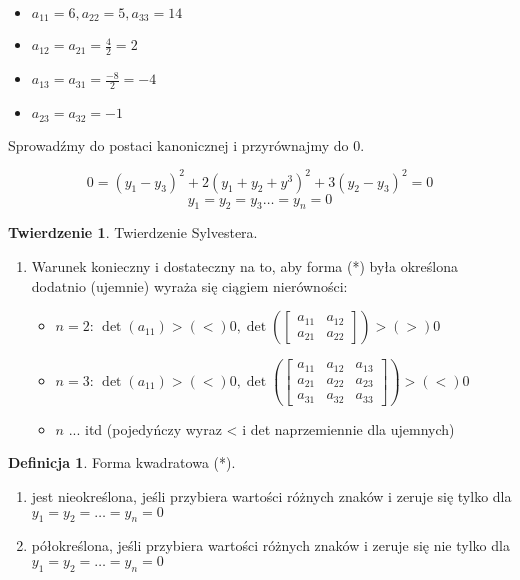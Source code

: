 \documentclass{article}
\theoremstyle{definition}
\newtheorem{de}{Definicja}[subsection]
\theoremstyle{definition}
\newtheorem{tw}{Twierdzenie}[subsection]
\theoremstyle{definition}
\theoremstyle{definition}
\theoremstyle{definition}
\theoremstyle{definition}
\theoremstyle{definition}
\begin{document}
\begin{itemize}
    \item $a_{11}=6, a_{22}=5, a_{33}=14$
    \item $a_{12}=a_{21}=\frac{4}{2}=2$
    \item $a_{13}=a_{31}=\frac{-8}{2}=-4$
    \item $a_{23}=a_{32}=-1$
\end{itemize}

Sprowadźmy do postaci kanonicznej i przyrównajmy do 0.

\[0=(y_1-y_3)^2+2(y_1+y_2+y^3)^2+3(y_2-y_3)^2=0\]
\[y_1=y_2=y_3\dots=y_n=0\]

\begin{tw}
    Twierdzenie Sylvestera.
    \begin{enumerate}
        \item Warunek konieczny i dostateczny na to, aby forma (*) była określona dodatnio (ujemnie) wyraża się ciągiem nierówności:
        \begin{itemize}
        \item $n=2$: $\det(a_{11})> (<) 0, \det\left(\begin{bmatrix}
            a_{11} & a_{12} \\
            a_{21} & a_{22} 
            \end{bmatrix} \right) > (>) 0$\\
        \item $n=3$: $\det(a_{11})> (<) 0, \det\left( \begin{bmatrix}
            a_{11} & a_{12} & a_{13} \\
            a_{21} & a_{22} & a_{23} \\
            a_{31} & a_{32} & a_{33} 
            \end{bmatrix} \right)  > (<) 0$\\
        \item $n$ ... itd (pojedyńczy wyraz < i det naprzemiennie dla ujemnych)
        \end{itemize}
    \end{enumerate}
\end{tw}

\begin{de}
    Forma kwadratowa (*).
    \begin{enumerate}
        \item jest nieokreślona, jeśli przybiera wartości różnych znaków i zeruje się tylko dla \\ $y_1=y_2=\dots=y_n=0$
        \item półokreślona, jeśli przybiera wartości różnych znaków i zeruje się nie tylko dla \\ $y_1=y_2=\dots=y_n=0$
    \end{enumerate}
\end{de}
\end{document}
